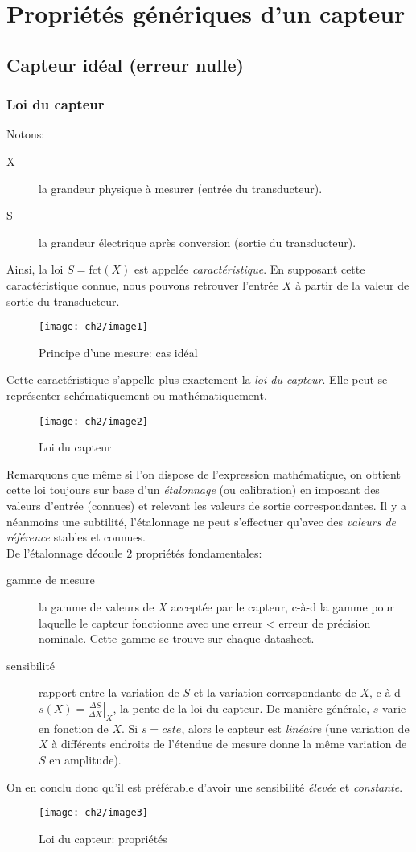 \chapter{Propriétés génériques d'un capteur}
\section{Capteur idéal (erreur nulle)}
\subsection{Loi du capteur}
Notons:
\begin{description}
	\item[X] la grandeur physique à mesurer (entrée du transducteur).
	\item[S] la grandeur électrique après conversion (sortie du transducteur).
\end{description}
Ainsi, la loi $S=\text{fct}(X)$ est appelée \emph{caractéristique}. En supposant cette caractéristique connue, nous pouvons retrouver l'entrée $X$ à partir de la valeur de sortie du transducteur.
\begin{figure}[H] 
	\centering 
	\texttt{[image: ch2/image1]} 
	\caption{Principe d'une mesure: cas idéal}
\end{figure} 
Cette caractéristique s'appelle plus exactement la \emph{loi du capteur}. Elle peut se représenter schématiquement ou mathématiquement. 
\begin{figure}[H] 
	\centering 
	\texttt{[image: ch2/image2]} 
	\caption{Loi du capteur}
\end{figure}
Remarquons que même si l'on dispose de l'expression mathématique, on obtient cette loi toujours sur base d'un \emph{étalonnage} (ou calibration) en imposant des valeurs d'entrée (connues) et relevant les valeurs de sortie correspondantes. Il y a néanmoins une subtilité, l'étalonnage ne peut s'effectuer qu'avec des \emph{valeurs de référence} stables et connues.\\

De l'étalonnage découle 2 propriétés fondamentales:
\begin{description}
	\item[gamme de mesure] la gamme de valeurs de $X$ acceptée par le capteur, c-à-d la gamme pour laquelle le capteur fonctionne avec une erreur < erreur de précision nominale. Cette gamme se trouve sur chaque datasheet.
	\item[sensibilité] rapport entre la variation de $S$ et la variation correspondante de $X$, c-à-d $s(X)=\left.\frac{\Delta S}{\Delta X}\right|_X$, la pente de la loi du capteur. De manière générale, $s$ varie en fonction de $X$. Si $s=cste$, alors le capteur est \emph{linéaire} (une variation de $X$ à différents endroits de l'étendue de mesure donne la même variation de $S$ en amplitude).
\end{description}
On en conclu donc qu'il est préférable d'avoir une sensibilité \emph{élevée} et \emph{constante}.
\begin{figure}[H] 
	\centering 
	\texttt{[image: ch2/image3]} 
	\caption{Loi du capteur: propriétés}
\end{figure}
